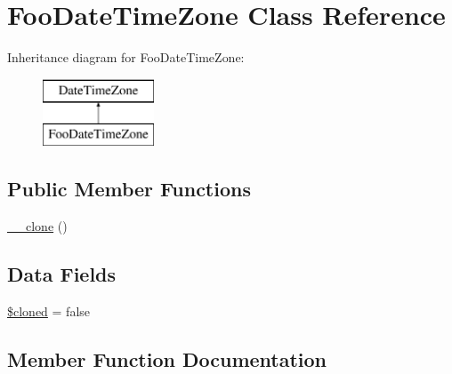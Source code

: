 \hypertarget{class_deep_copy_1_1f007_1_1_foo_date_time_zone}{}\section{Foo\+Date\+Time\+Zone Class Reference}
\label{class_deep_copy_1_1f007_1_1_foo_date_time_zone}
Inheritance diagram for Foo\+Date\+Time\+Zone\+:\begin{figure}[H]
\begin{center}
\leavevmode
\includegraphics[height=2.000000cm]{class_deep_copy_1_1f007_1_1_foo_date_time_zone}
\end{center}
\end{figure}
\subsection*{Public Member Functions}
\begin{DoxyCompactItemize}
\item 
\mbox{\hyperlink{class_deep_copy_1_1f007_1_1_foo_date_time_zone_ad0cb87b388bc74d63dc884accdca8713}{\+\_\+\+\_\+clone}} ()
\end{DoxyCompactItemize}
\subsection*{Data Fields}
\begin{DoxyCompactItemize}
\item 
\mbox{\hyperlink{class_deep_copy_1_1f007_1_1_foo_date_time_zone_adde823dfad7d62fbfb51f60b16dcb8d6}{\$cloned}} = false
\end{DoxyCompactItemize}


\subsection{Member Function Documentation}
\mbox{\label{class_deep_copy_1_1f007_1_1_foo_date_time_zone_ad0cb87b388bc74d63dc884accdca8713}} 
